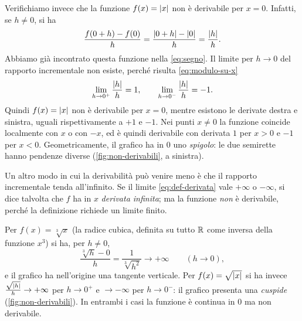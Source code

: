 \begin{esempio}\label{es:modulo-non-derivabile}
Verifichiamo invece che la funzione $f(x)=\lvert x\rvert$ non è derivabile per $x=0$. Infatti, se
$h\neq0$, si ha
\begin{equation}\label{eq:rapporto-modulo}
  \frac{f(0+h)-f(0)}{h}=\frac{\lvert 0+h\rvert-\lvert 0\rvert}{h}=\frac{\lvert h\rvert}{h}.
\end{equation}
Abbiamo già incontrato questa funzione nella \eqref{eq:segno}. Il limite per $h\to0$ del
rapporto incrementale non esiste, perché risulta \eqref{eq:modulo-su-x}
\begin{equation}\label{eq:derivate-modulo}
  \lim_{h\to0^{+}}\frac{\lvert h\rvert}{h}=1, \qquad \lim_{h\to0^{-}}\frac{\lvert h\rvert}{h}=-1 .
\end{equation}
Quindi $f(x)=\lvert x\rvert$ non è derivabile per $x=0$, mentre esistono le derivate destra e
sinistra, uguali rispettivamente a $+1$ e $-1$. Nei punti $x\neq0$ la funzione coincide
localmente con $x$ o con $-x$, ed è quindi derivabile con derivata $1$ per $x>0$ e $-1$
per $x<0$. Geometricamente, il grafico ha in $0$ uno \emph{spigolo}: le due semirette
hanno pendenze diverse (\cref{fig:non-derivabili}, a sinistra).
\end{esempio}

Un altro modo in cui la derivabilità può venire meno è che il rapporto incrementale
tenda all'infinito. Se il limite \eqref{eq:def-derivata} vale $+\infty$ o $-\infty$, si
dice talvolta che $f$ ha in $x$ \emph{derivata infinita}; ma la funzione \emph{non} è
derivabile, perché la definizione richiede un limite finito.

\begin{esempio}\label{es:derivate-infinite}
Per $f(x)=\sqrt[3]x$ (la radice cubica, definita su tutto $\mathbb{R}$ come inversa della
funzione $x^{3}$) si ha, per $h\neq0$,
\[
  \frac{\sqrt[3]h-0}{h}=\frac1{\sqrt[3]{h^{2}}}\to+\infty \qquad (h\to0),
\]
e il grafico ha nell'origine una tangente verticale. Per $f(x)=\sqrt{\lvert x\rvert}$ si ha invece
$\frac{\sqrt{\lvert h\rvert}}{h}\to+\infty$ per $h\to0^{+}$ e $\to-\infty$ per $h\to0^{-}$: il
grafico presenta una \emph{cuspide} (\cref{fig:non-derivabili}). In entrambi i casi la
funzione è continua in $0$ ma non derivabile.
\end{esempio}

